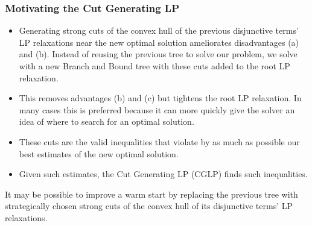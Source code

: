 \documentclass{beamer}
\begin{document}
	\begin{frame}[t]
		\frametitle{Motivating the Cut Generating LP}
		\small
		\begin{itemize}
			\item Generating strong cuts of the convex hull of the previous disjunctive terms’ LP relaxations near the new optimal solution ameliorates disadvantages (a) and (b). Instead of reusing the previous tree to solve our problem, we solve with a new Branch and Bound tree with these cuts added to the root LP relaxation.
			\item This removes advantages (b) and (c) but tightens the root LP relaxation. In many cases this is preferred because it can more quickly give the solver an idea of where to search for an optimal solution.
			\item These cuts are the valid inequalities that violate by as much as possible our best estimates of the new optimal solution.
			\item Given such estimates, the Cut Generating LP (CGLP) finds such inequalities.
		\end{itemize}
		\vspace{.25cm}
		\begin{block}{}
			It may be possible to improve a warm start by replacing the previous tree with strategically chosen strong cuts of the convex hull of its disjunctive terms' LP relaxations.
		\end{block}
		\normalsize
	\end{frame}
\end{document}
